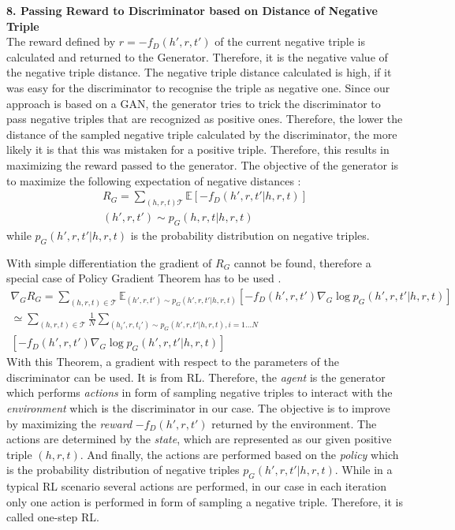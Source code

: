 \textbf{8. Passing Reward to Discriminator based on Distance of Negative Triple}\\


The reward defined by $r = - f_D(h',r,t')$ of the current negative triple is calculated and returned to the Generator.
Therefore, it is the negative value of the negative triple distance.
The negative triple distance calculated is high, if it was easy for the discriminator to recognise the triple as negative one.
Since our approach is based on a \ac{GAN}, the generator tries to trick the discriminator to pass negative triples that are recognized as positive ones.
Therefore, the lower the distance of the sampled negative triple calculated by the discriminator, the more likely it is that this was mistaken for a positive triple.
Therefore, this results in maximizing the reward passed to the generator.
The objective of the generator is to maximize the following expectation of negative distances \cite{cai2017kbgan}:
\begin{multline}
    R_G = \sum_{(h,r,t) \mathcal{T}}{\mathbb{E}[-f_D(h',r,t'|h,r,t)]}\\
    (h',r,t') \sim p_G(h,r,t|h,r,t) 
\end{multline}
while $p_G(h', r, t'|h, r, t)$ is the probability distribution on negative triples.

With simple differentiation the gradient of $R_G$ cannot be found, therefore a special case of Policy Gradient Theorem has to be used \cite{cai2017kbgan}.
\begin{multline}
    \nabla_G R_G=\sum_{(h,r,t)\in\mathcal{T}}\mathbb{E}_{(h',r,t')\sim p_G(h',r,t'|h,r,t)}
    [-f_D(h',r,t')\nabla_G \log p_G(h',r,t'|h,r,t)] \\
    \simeq \sum_{(h,r,t)\in\mathcal{T}}\frac{1}{N}\sum_{(h_i',r,t_i')\sim p_G(h',r,t'|h,r,t), i=1\dots N} \\
    [-f_D(h',r,t')\nabla_G \log p_G(h',r,t'|h,r,t)]
\end{multline}
With this Theorem, a gradient with respect to the parameters of the discriminator can be used.
It is from \ac{RL}.
Therefore, the \textit{agent} is the generator which performs \textit{actions} in form of sampling negative triples to interact with the \textit{environment} which is the discriminator in our case.
The objective is to improve by maximizing the \textit{reward} $-f_D(h',r,t')$ returned by the environment.
The actions are determined by the \textit{state}, which are represented as our given positive triple $(h,r,t)$.
And finally, the actions are performed based on the \textit{policy} which is the probability distribution of negative triples $p_G(h',r,t'|h,r,t)$.
While in a typical \ac{RL} scenario several actions are performed, in our case in each iteration only one action is performed in form of sampling a negative triple.
Therefore, it is called one-step \ac{RL}.



